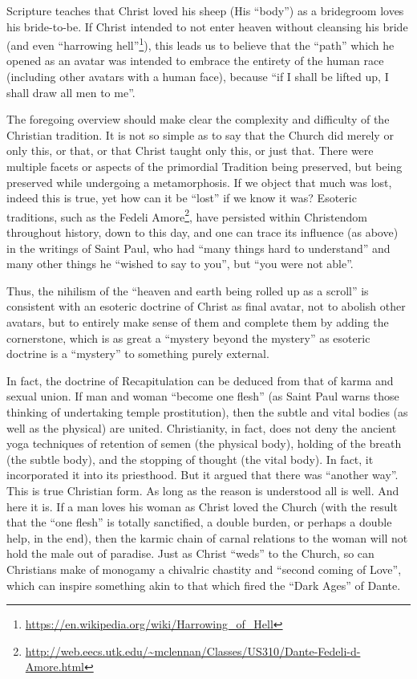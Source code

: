 Scripture teaches that Christ loved his sheep (His ``body'') as a bridegroom loves his bride-to-be. If Christ intended to not enter heaven without cleansing his bride (and even ``harrowing hell''\footnote{\url{https://en.wikipedia.org/wiki/Harrowing\_of\_Hell}}), this leads us to believe that the ``path'' which he opened as an avatar was intended to embrace the entirety of the human race (including other avatars with a human face), because ``if I shall be lifted up, I shall draw all men to me''.

The foregoing overview should make clear the complexity and difficulty of the Christian tradition. It is not so simple as to say that the Church did merely or only this, or that, or that Christ taught only this, or just that. There were multiple facets or aspects of the primordial Tradition being preserved, but being preserved while undergoing a metamorphosis. If we object that much was lost, indeed this is true, yet how can it be ``lost'' if we know it was? Esoteric traditions, such as the Fedeli Amore\footnote{\url{http://web.eecs.utk.edu/~mclennan/Classes/US310/Dante-Fedeli-d-Amore.html}}, have persisted within Christendom throughout history, down to this day, and one can trace its influence (as above) in the writings of Saint Paul, who had ``many things hard to understand'' and many other things he ``wished to say to you'', but ``you were not able''.

Thus, the nihilism of the ``heaven and earth being rolled up as a scroll'' is consistent with an esoteric doctrine of Christ as final avatar, not to abolish other avatars, but to entirely make sense of them and complete them by adding the cornerstone, which is as great a ``mystery beyond the mystery'' as esoteric doctrine is a ``mystery'' to something purely external.

In fact, the doctrine of Recapitulation can be deduced from that of karma and sexual union. If man and woman ``become one flesh'' (as Saint Paul warns those thinking of undertaking temple prostitution), then the subtle and vital bodies (as well as the physical) are united. Christianity, in fact, does not deny the ancient yoga techniques of retention of semen (the physical body), holding of the breath (the subtle body), and the stopping of thought (the vital body). In fact, it incorporated it into its priesthood. But it argued that there was ``another way''. This is true Christian form. As long as the reason is understood all is well. And here it is. If a man loves his woman as Christ loved the Church (with the result that the ``one flesh'' is totally sanctified, a double burden, or perhaps a double help, in the end), then the karmic chain of carnal relations to the woman will not hold the male out of paradise. Just as Christ ``weds'' to the Church, so can Christians make of monogamy a chivalric chastity and ``second coming of Love'', which can inspire something akin to that which fired the ``Dark Ages'' of Dante.

